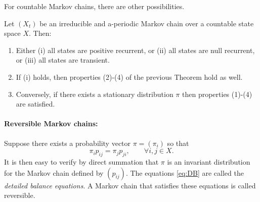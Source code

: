 For countable Markov chains, there are other possibilities.

\begin{theorem}
Let $({X_t})$ be an irreducible and a-periodic Markov chain over a countable state space $X$.  Then:
\begin{enumerate}
\item Either (i) all states are positive recurrent, or (ii) all states are null recurrent, or (iii) all states are transient.
\item If (i) holds, then properties (2)-(4) of the previous Theorem hold as well.
\item Conversely, if there exists a stationary distribution $\pi $ then properties (1)-(4) are satisfied.
\end{enumerate}
\end{theorem}

\paragraph{Reversible Markov chains:} Suppose there exists a probability vector $\pi  = ({\pi _i})$ so that
                                                \begin{equation}\label{eq:DB}
                                                {\pi _i}{p_{ij}} = {\pi _j}{p_{ji}},\quad \quad \forall i,j \in X.
                                                \end{equation}
It is then easy to verify by direct summation that $\pi $ is an invariant distribution for the Markov chain defined by $({p_{ij}})$.
The equations \eqref{eq:DB} are called the \emph{detailed balance equations}. A Markov chain that satisfies these equations is called reversible.

